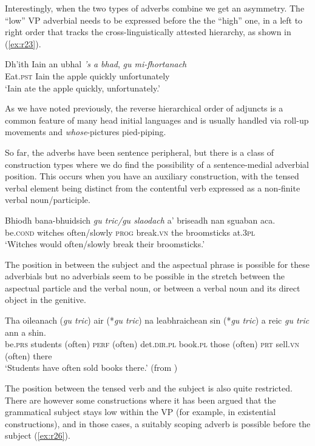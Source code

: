 \documentclass[output=paper,colorlinks,citecolor=brown]{langscibook}
\begin{document}
Interestingly, when the two types of adverbs combine we get an asymmetry. The “low” VP adverbial needs to be expressed before the the “high” one, in a left to right order that tracks the cross\hyp linguistically attested hierarchy, as shown in (\ref{ex:r23}). 

\ea\label{ex:r23}
\gll Dh'ith Iain an ubhal {\textit{'s a bhad}}, {\textit{gu mi-fhortanach}} \\
Eat.\textsc{pst} Iain the apple  quickly unfortunately \\
\glt `Iain ate the apple quickly, unfortunately.'
\z

\noindent As we have noted previously, the reverse hierarchical order of adjuncts is a common feature of many head initial languages and is usually handled via roll-up movements and \textit{whose}-pictures pied-piping.


So far, the adverbs have been sentence peripheral, but there is a class of construction types where we do find the possibility of a sentence-medial adverbial position. This occurs when you have an auxiliary construction, with the tensed verbal element being distinct from the contentful verb expressed as a non-finite verbal noun/participle. 

\ea
\label{ex:r24}
\gll Bhiodh bana-bhuidsich {\textit{gu tric/gu slaodach}} a'   briseadh nan sguaban aca. \\
be.\textsc{cond} witches often/slowly \textsc{prog}  break.\textsc{vn} the broomsticks at.\textsc{3pl} \\
\glt `Witches would often/slowly break their broomsticks.'
\z

\noindent The position in between the subject and the aspectual phrase is possible for these adverbials but no adverbials seem to be possible in the stretch between the aspectual particle and the verbal noun, or between a verbal noun and its direct object in the genitive. 

\ea\label{ex:r25}
\gll Tha oileanach {(\textit{gu tric})} air {(*\textit{gu tric})} na leabhraichean  sin {(*\textit{gu tric})} a reic {\textit{gu tric}} {ann a shin}.  \\
be.\textsc{prs} students (often) \textsc{perf} (often) det.\textsc{dir.pl}  book.\textsc{pl}  those (often) \textsc{prt} sell.\textsc{vn} (often) there \\
\glt `Students have often sold books there.' (from \citealt{adger10e})
\z


\noindent The position between the tensed verb and the subject is also quite restricted. There are however some constructions where it has been argued that the grammatical subject stays low within the VP (for example, in existential constructions), and in those cases, a suitably scoping adverb is possible before the subject (\ref{ex:r26}). 
\end{document}
